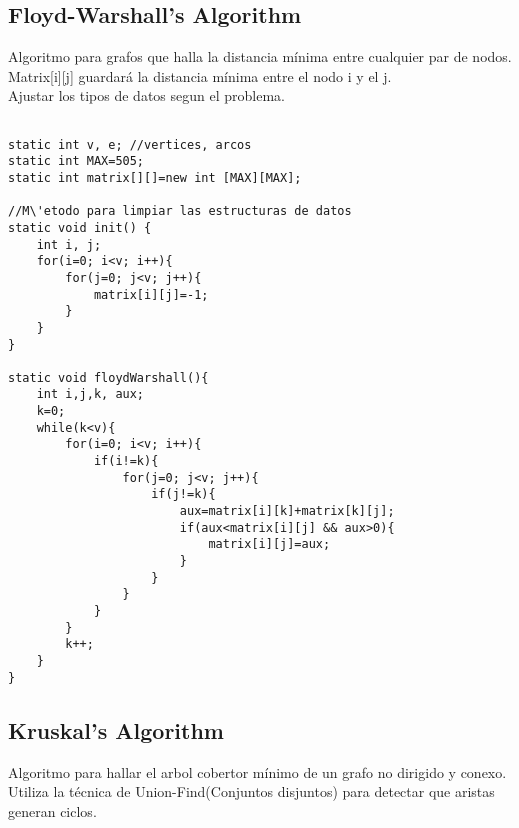 \documentclass[11pt,letterpaper,twocolumn,twosided]{article}
\begin{document}
\subsection{Floyd-Warshall's Algorithm}
Algoritmo para grafos que halla la distancia m\'inima entre cualquier par de nodos. Matrix[i][j] guardar\'a la distancia m\'inima entre el nodo i y el j.\\
Ajustar los tipos de datos segun el problema.

\begin{lstlisting}

static int v, e; //vertices, arcos
static int MAX=505;     
static int matrix[][]=new int [MAX][MAX];

//M\'etodo para limpiar las estructuras de datos
static void init() {
    int i, j;
    for(i=0; i<v; i++){
        for(j=0; j<v; j++){
            matrix[i][j]=-1;
        }
    }
}

static void floydWarshall(){
    int i,j,k, aux;
    k=0;
    while(k<v){
        for(i=0; i<v; i++){
            if(i!=k){
                for(j=0; j<v; j++){
                    if(j!=k){
                        aux=matrix[i][k]+matrix[k][j];
                        if(aux<matrix[i][j] && aux>0){ 
                            matrix[i][j]=aux;
                        }
                    }
                }
            }
        }
        k++;
    }
}
\end{lstlisting}

\subsection{Kruskal's Algorithm}
Algoritmo para hallar el arbol cobertor m\'inimo de un grafo  no dirigido y conexo. Utiliza la t\'ecnica de Union-Find(Conjuntos disjuntos) para detectar que aristas generan ciclos.
\end{document}
